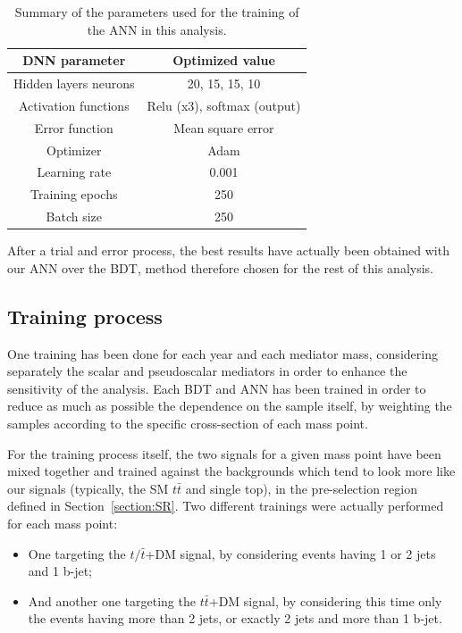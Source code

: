 \documentclass[a4paper, 10pt, openright]{report}
\begin{document}
\begin{table}
\begin{center}
\begin{tabular}{ c|c } 
\hline
 DNN parameter & Optimized value \\
 \hline
 Hidden layers neurons & 20, 15, 15, 10 \\
 Activation functions & Relu (x3), softmax (output) \\
Error function & Mean square error \\
Optimizer & Adam \\
Learning rate & 0.001 \\
Training epochs & 250 \\
Batch size & 250 \\
\hline
\end{tabular}
\caption{Summary of the parameters used for the training of the \ac{ANN} in this analysis.}
\label{table:DNN}
\end{center}
\end{table}

After a trial and error process, the best results have actually been obtained with our \ac{ANN} over the \ac{BDT}, method therefore chosen for the rest of this analysis.%

\subsection{Training process}

One training has been done for each year and each mediator mass, considering separately the scalar and pseudoscalar mediators in order to enhance the sensitivity of the analysis. Each \ac{BDT} and \ac{ANN} has been trained in order to reduce as much as possible the dependence on the sample itself, by weighting the samples according to the specific cross-section of each mass point. 

For the training process itself, the two signals for a given mass point have been mixed together and trained against the backgrounds which tend to look more like our signals (typically, the \ac{SM} $t \bar t$ and single top), in the pre-selection region defined in Section~\ref{section:SR}. Two different trainings were actually performed for each mass point:
\begin{itemize}
\item One targeting the $t/\bar t$+DM signal, by considering events having 1 or 2 jets and 1 b-jet;
\item And another one targeting the $t \bar t$+DM signal, by considering this time only the events having more than 2 jets, or exactly 2 jets and more than 1 b-jet.
\end{itemize}
\end{document}
